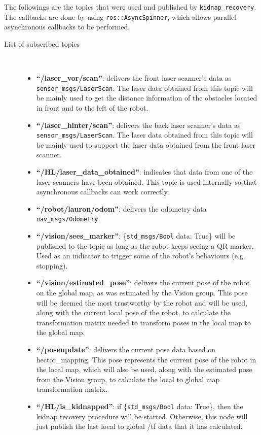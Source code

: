 The followings are the topics that were used and published by \texttt{kidnap\_recovery}. The callbacks are done by using \texttt{ros::AsyncSpinner}, which allows parallel asynchronous callbacks to be performed.

\begin{description}
\item[List of subscribed topics]\
	\begin{itemize}
	\item \textbf{``/laser\_vor/scan''}: delivers the front laser scanner's data as \texttt{sensor\_msgs/LaserScan}. The laser data obtained from this topic will be mainly used to get the distance information of the obstacles located in front and to the left of the robot.
	\item \textbf{``/laser\_hinter/scan''}: delivers the back laser scanner's data as \texttt{sensor\_msgs/LaserScan}. The laser data obtained from this topic will be mainly used to support the laser data obtained from the front laser scanner.
	\item \textbf{``/HL/laser\_data\_obtained''}: indicates that data from one of the laser scanners have been obtained. This topic is used internally so that asynchronous callbacks can work correctly.
	\item \textbf{``/robot/lauron/odom''}: delivers the odometry data \texttt{nav\_msgs/Odometry}.
	\item \textbf{``/vision/sees\_marker''}: \{\texttt{std\_msgs/Bool} data: True\} will be published to the topic as long as the robot keeps seeing a QR marker. Used as an indicator to trigger some of the robot's behaviours (e.g. stopping).
	\item \textbf{``/vision/estimated\_pose''}: delivers the current pose of the robot on the global map, as was estimated by the Vision group. This pose will be deemed the most trustworthy by the robot and will be used, along with the current local pose of the robot, to calculate the transformation matrix needed to transform poses in the local map to the global map.
	\item \textbf{``/poseupdate''}: delivers the current pose data based on hector\_mapping. This pose represents the current pose of the robot in the local map, which will also be used, along with the estimated pose from the Vision group, to calculate the local to global map transformation matrix.
	\item \textbf{``/HL/is\_kidnapped''}: if \{\texttt{std\_msgs/Bool} data: True\}, then the kidnap recovery procedure will be started. Otherwise, this node will just publish the last local to global /tf data that it has calculated.
	\end{itemize}
\end{description}

